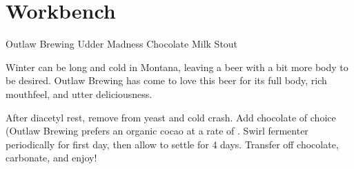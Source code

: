 \documentclass[fontsize=9pt,oneside]{scrbook}
\begin{document}
\mainmatter
\twocolumn

\part{Workbench}

\begin{recipie}{Outlaw Brewing Udder Madness Chocolate Milk Stout}

\begin{aboutblock}
Winter can be long and cold in Montana, leaving a beer with a bit more body to be
desired. Outlaw Brewing has come to love this beer for its full body, rich
mouthfeel, and utter deliciousness. \sourceaha
\end{aboutblock}


\begin{methodandtiming}
 
\begin{mashsteps}
\end{mashsteps}

\begin{fermentationsteps}
\end{fermentationsteps}

\begin{fermentationsteps}
\end{fermentationsteps}

\begin{directions}
After diacetyl rest, remove from yeast and cold crash. Add chocolate of
choice (Outlaw Brewing prefers an organic cocao at a rate of .
Swirl fermenter periodically for first day, then allow to settle for 4 days.
Transfer off chocolate, carbonate, and enjoy!
\end{directions}

\end{methodandtiming}

\pagebreak

\begin{ingredientsblock}
 
\begin{malts}
\end{malts}


\end{ingredientsblock}
\end{recipie}
\end{document}
